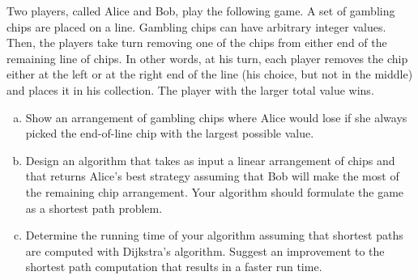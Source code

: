 \documentclass[fleqn]{homework}
\begin{document}
  \begin{problem}{5}
    \begin{question}
      Two players, called Alice and Bob, play the following game. A set of
      gambling chips are placed on a line. Gambling chips can have arbitrary
      integer values. Then, the players take turn removing one of the chips from
      either end of the remaining line of chips. In other words, at his turn,
      each player removes the chip either at the left or at the right end of the
      line (his choice, but not in the middle) and places it in his collection.
      The player with the larger total value wins.

      \begin{enumerate}[a.]
      \item Show an arrangement of gambling chips where Alice would lose if she
        always picked the end-of-line chip with the largest possible value.
      \item Design an algorithm that takes as input a linear arrangement of
        chips and that returns Alice’s best strategy assuming that Bob will make
        the most of the remaining chip arrangement. Your algorithm should
        formulate the game as a shortest path problem.  
      \item Determine the running time of your algorithm assuming that shortest
        paths are computed with Dijkstra’s algorithm. Suggest an improvement to
        the shortest path computation that results in a faster run time.
      \end{enumerate}
    \end{question}
  \end{problem}
\end{document}
